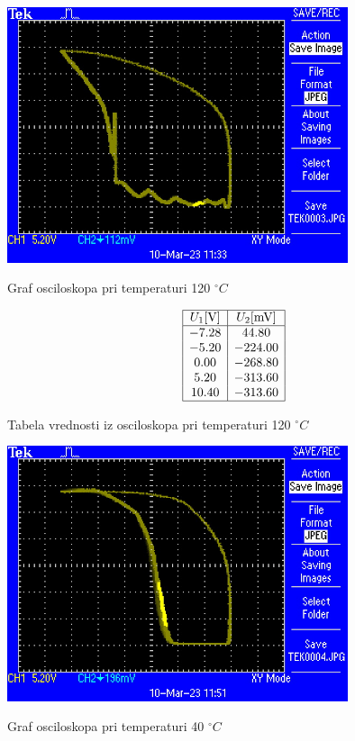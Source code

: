 \documentclass[12pt]{report}
\begin{document}
\begin{slika}[H]
  \centering
  \includegraphics[width= 0.75\textwidth]{TEK0003}
  \caption{\small Graf osciloskopa pri temperaturi 120 $^\circ C$}
\end{slika}

\begin{tabela}[H]
  \centering
  \[
      \begin{array}{|c|c|c|} \hline
        U_1 [\si{V}] & U_2 [\si{mV}] \\ \hline
        -7.28 &   44.80\\
        -5.20 & -224.00\\
          0.00 & -268.80\\
          5.20 & -313.60\\
         10.40 & -313.60 \\ \hline
    \end{array}
  \]
  \caption{\small Tabela vrednosti iz osciloskopa pri temperaturi 120 $^\circ C$}
\end{tabela}

\begin{slika}[H]
  \centering
  \includegraphics[width= 0.75\textwidth]{TEK0004}
  \caption{\small Graf osciloskopa pri temperaturi 40 $^\circ C$}
\end{slika}
\end{document}
